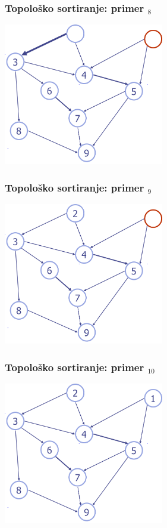 \documentclass[compress]{beamer}
\begin{document}
\begin{frame}[fragile]
  \frametitle{Topološko sortiranje: primer $_8$}
  \begin{center}
    \includegraphics[width=7cm]{asp-14-pic55.png}
  \end{center}
\end{frame}

\begin{frame}[fragile]
  \frametitle{Topološko sortiranje: primer $_9$}
  \begin{center}
    \includegraphics[width=7cm]{asp-14-pic56.png}
  \end{center}
\end{frame}

\begin{frame}[fragile]
  \frametitle{Topološko sortiranje: primer $_{10}$}
  \begin{center}
    \includegraphics[width=7cm]{asp-14-pic57.png}
  \end{center}
\end{frame}
\end{document}
